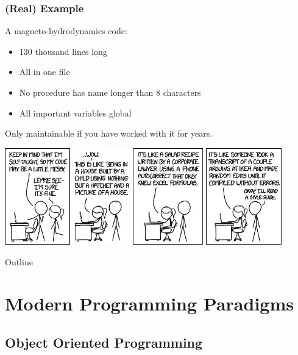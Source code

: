 \documentclass[12pt]{beamer}
\begin{document}
\begin{frame}
  \frametitle{(Real) Example}
  A magneto-hydrodynamics code:
  \begin{itemize}
  \item 130 thousand lines long
  \item All in one file
  \item No procedure has name longer than 8 characters
  \item All important variables global
  \end{itemize}
  
  Only maintainable if you have worked with it for years.
  
  \begin{center}
    \includegraphics[width=0.9\textwidth]{code_quality.png}
    
    \vspace{-2mm}{\tiny https://xkcd.com/1513/}
  \end{center}
  
\end{frame}

\begin{frame}{Outline}
  \tableofcontents
\end{frame}


\section{Modern Programming Paradigms}

\subsection{Object Oriented Programming}
\end{document}
